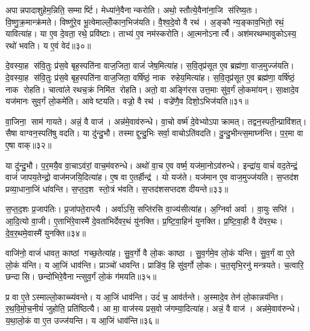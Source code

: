 अपान्नपादाशुहेम॒न्निति॒ सम्मार्ष्टि।
मेध्या॑ने॒वैनान्करोति।
अथो॒ स्तौत्ये॒वैना॑ना॒जि स॑रिष्य॒तः।
वि॒ष्णु॒क्र॒मान्क्र॑मते।
विष्णु॑रे॒व भू॒त्वेमाल्लोँ॒कान॒भिज॑यति।
वै॒श्व॒दे॒वो वै रथ॑।
अ॒ङ्कौ न्य॒ङ्काव॒भितो॒ रथं॒ यावित्या॑ह।
या ए॒व दे॒वता॒ रथे॒ प्रवि॑ष्टाः।
ताभ्य॑ ए॒व नम॑स्करोति।
आ॒त्मनोऽनार्त्यै।
अश॑मरथम्भावुकोऽस्य॒ रथो॑ भवति।
य ए॒वं वेद॑॥३०॥\anuvakamend[स्व॒द॒य॒ति॒ प॒ल्पू॒लय॑ति॒ व्यावृ॑त्त्या॒ अनार्त्यै॒ द्वे च॑]

दे॒वस्या॒ह स॑वि॒तुः प्र॑स॒वे बृह॒स्पति॑ना वाज॒जिता॒ वाजं॑ जेष॒मित्या॑ह।
स॒वि॒तृप्र॑सूत ए॒व ब्रह्म॑णा॒ वाज॒मुज्ज॑यति।
दे॒वस्या॒ह स॑वि॒तुः प्र॑स॒वे बृह॒स्पति॑ना वाज॒जिता॒ वर्\mbox{}षि॑ष्ठं॒ नाक रुहेय॒मित्या॑ह।
स॒वि॒तृप्र॑सूत ए॒व ब्रह्म॑णा॒ वर्\mbox{}षि॑ष्ठं॒ नाक रोहति।
चात्वा॑ले रथच॒क्रं निमि॑त रोहति।
अतो॒ वा अङ्गि॑रस उत्त॒माः सु॑व॒र्गं लो॒कमा॑यन्।
सा॒क्षादे॒व यज॑मानः सुव॒र्गं लो॒कमे॑ति।
आवेष्टयति।
वज्रो॒ वै रथ॑।
वज्रे॑णै॒व दिशो॒ऽभिज॑यति॥३१॥

वा॒जिना॒ साम॑ गायते।
अन्नं॒ वै वाज॑।
अन्न॑मे॒वाव॑रुन्धे।
वा॒चो वर्ष्म॑ दे॒वेभ्योऽपाक्रामत्।
तद्वन॒स्पती॒न्प्रावि॑शत्।
सैषा वाग्वन॒स्पति॑षु वदति।
या दु॑न्दु॒भौ।
तस्माद्दुन्दु॒भिः सर्वा॒ वाचोऽति॑वदति।
दु॒न्दु॒भीन्त्स॒माघ्न॑न्ति।
प॒र॒मा वा ए॒षा वाक्॥३२॥

या दु॑न्दु॒भौ।
प॒र॒मयै॒व वा॒चाऽव॑रां॒ वाच॒म॑वरुन्धे।
अथो॑ वा॒च ए॒व वर्ष्म॒ यज॑मा॒नोऽव॑रुन्धे।
इन्द्रा॑य॒ वाचं॑ वद॒तेन्द्रं॒ वाजं॑ जापय॒तेन्द्रो॒ वाज॑मजयि॒दित्या॑ह।
ए॒ष वा ए॒तर्\mbox{}हीन्द्र॑।
यो यज॑ते।
यज॑मान ए॒व वाज॒मुज्ज॑यति।
स॒प्तद॑श प्रव्या॒धाना॒जिं धा॑वन्ति।
स॒प्त॒द॒श स्तो॒त्रं भ॑वति।
स॒प्तद॑शसप्तदश दीयन्ते॥३३॥

स॒प्त॒द॒शः प्र॒जाप॑तिः।
प्र॒जा॑पते॒राप्त्यै।
अर्वा॑ऽसि॒ सप्ति॑रसि वा॒ज्य॑सीत्या॑ह।
अ॒ग्निर्वा अर्वा।
वा॒युः सप्ति॑।
आ॒दि॒त्यो वा॒जी।
ए॒ताभि॑रे॒वास्मै॑ दे॒वता॑भिर्देवर॒थं यु॑नक्ति।
प्र॒ष्टि॒वा॒हिनं॑ युनक्ति।
प्र॒ष्टि॒वा॒ही वै दे॑वर॒थः।
दे॒व॒र॒थमे॒वास्मै॑ युनक्ति॥३४॥

वाजि॑नो॒ वाजं॑ धावत॒ काष्ठां गच्छ॒तेत्या॑ह।
सु॒व॒र्गो वै लो॒कः काष्ठा।
सु॒व॒र्गमे॒व लो॒कं य॑न्ति।
सु॒व॒र्गं वा ए॒ते लो॒कं य॑न्ति।
य आ॒जिं धाव॑न्ति।
प्राञ्चो॑ धावन्ति।
प्राङि॑व॒ हि सु॑व॒र्गो लो॒कः।
च॒त॒सृभि॒रनु॑ मन्त्रयते।
च॒त्वारि॒ छन्दासि।
छन्दो॑भिरे॒वैनान्त्सुव॒र्गं लो॒कं ग॑मयति॥३५॥

प्र वा ए॒तेऽस्माल्लो॒काच्च्य॑वन्ते।
य आ॒जिं धाव॑न्ति।
उदं॑ च॒ आव॑र्तन्ते।
अ॒स्मादे॒व तेन॑ लो॒कान्नय॑न्ति।
र॒थ॒वि॒मो॒च॒नीयं॑ जुहोति॒ प्रति॑ष्ठित्यै।
आ मा॒ वाज॑स्य प्रस॒वो ज॑गम्या॒दित्या॑ह।
अन्नं॒ वै वाज॑।
अन्न॑मे॒वाव॑रुन्धे।
य॒था॒लो॒कं वा ए॒त उज्ज॑यन्ति।
य आ॒जिं धाव॑न्ति॥३६॥

